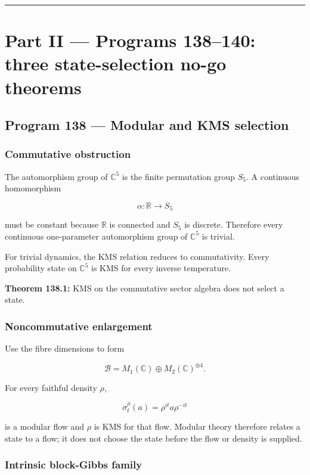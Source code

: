 \documentclass[11pt,a4paper,openany]{report}
\begin{document}
\par\medskip\hrule\medskip

\chapter{Part II --- Programs 138--140: three state-selection no-go theorems}

\section{Program 138 --- Modular and KMS selection}

\subsection{Commutative obstruction}

The automorphism group of \(\mathbb C^5\) is the finite permutation group \(S_5\). A continuous homomorphism

\[
\alpha:\mathbb R\to S_5
\]

must be constant because \(\mathbb R\) is connected and \(S_5\) is discrete. Therefore every continuous one-parameter automorphism group of \(\mathbb C^5\) is trivial.

For trivial dynamics, the KMS relation reduces to commutativity. Every probability state on \(\mathbb C^5\) is KMS for every inverse temperature.

\textbf{Theorem 138.1:} KMS on the commutative sector algebra does not select a state.

\subsection{Noncommutative enlargement}

Use the fibre dimensions to form

\[
\mathcal B
=
M_1(\mathbb C)
\oplus
M_2(\mathbb C)^{\oplus4}.
\]

For every faithful density \(\rho\),

\[
\sigma_t^\rho(a)
=
\rho^{it}a\rho^{-it}
\]

is a modular flow and \(\rho\) is KMS for that flow. Modular theory therefore relates a state to a flow; it does not choose the state before the flow or density is supplied.

\subsection{Intrinsic block-Gibbs family}
\end{document}
